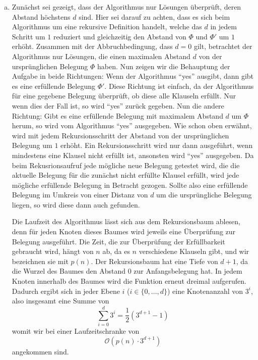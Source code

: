 \documentclass[12pt,a4paper]{article}
\begin{document}
\begin{enumerate}[a)] 
	\item Zunächst sei gezeigt, dass der Algorithmus nur Lösungen überprüft, deren Abstand höchstens $d$ sind. Hier sei darauf zu achten, dass es sich beim Algorithmus um eine rekursive Definition handelt, welche das $d$ in jedem Schritt um $1$ reduziert und gleichzeitig den Abstand von $\Phi$ und $\Phi'$ um $1$ erhöht. Zusammen mit der Abbruchbedingung, dass $d=0$ gilt, betrachtet der Algorithmus nur Lösungen, die einen maximalen Abstand $d$ von der ursprünglichen Belegung $\Phi$ haben. Nun zeigen wir die Behauptung der Aufgabe in beide Richtungen: Wenn der Algorithmus "`yes"' ausgibt, dann gibt es eine erfüllende Belegung $\Phi'$. Diese Richtung ist einfach, da der Algorithmus für eine gegebene Belegung überprüft, ob diese alle Klauseln erfüllt. Nur wenn dies der Fall ist, so wird "`yes"' zurück gegeben. Nun die andere Richtung: Gibt es eine erfüllende Belegung mit maximalem Abstand $d$ um $\Phi$ herum, so wird vom Algorithmus "`yes"' ausgegeben. Wie schon oben erwähnt, wird mit jedem Rekursionsschritt der Abstand von der ursprünglichen Belegung um $1$ erhöht. Ein Rekursionsschritt wird nur dann ausgeführt, wenn mindestens eine Klausel nicht erfüllt ist, ansonsten wird "`yes"' ausgegeben. Da beim Rekusrionsaufruf jede mögliche neue Belegung getestet wird, die die aktuelle Belegung für die zunächst nicht erfüllte Klausel erfüllt, wird jede mögliche erfüllende Belegung in Betracht gezogen. Sollte also eine erfüllende Belegung im Umkreis von einer Distanz von $d$ um die ursprüngliche Belegung liegen, so wird diese dann auch gefunden.
		
		Die Laufzeit des Algorithmus lässt sich aus dem Rekursionsbaum ablesen, denn für jeden Knoten dieses Baumes wird jeweils eine Überprüfung zur Belegung ausgeführt. Die Zeit, die zur Überprüfung der Erfüllbarkeit gebraucht wird, hängt von $n$ ab, da es $n$ verschiedene Klauseln gibt, und wir bezeichnen sie mit $p(n)$. Der Rekursionsbaum hat eine Tiefe von $d+1$, da die Wurzel des Baumes den Abstand $0$ zur Anfangsbelegung hat. In jedem Knoten innerhalb des Baumes wird die Funktion erneut dreimal aufgerufen. Dadurch ergibt sich in jeder Ebene $i$ ($i \in \{0,\dots,d\}$) eine Knotenanzahl von $3^i$, also insgesamt eine Summe von
		$$\sum_{i=0}^d 3^i = \frac{1}{2}(3^{d+1} - 1)$$
		womit wir bei einer Laufzeitschranke von
		$$\mathcal{O}(p(n) \cdot 3^{d+1})$$
		angekommen sind.
\end{enumerate} 
\end{document}
